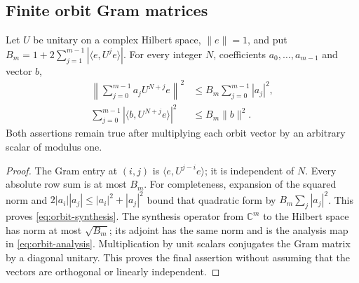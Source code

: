 \subsection{Finite orbit Gram matrices}
\begin{lemma}
\label{lem:finite-orbit-frame}
Let $U$ be unitary on a complex Hilbert space, $\|e\|=1$, and put
$B_m=1+2\sum_{j=1}^{m-1}|\langle e,U^je\rangle|$.
For every integer $N$, coefficients $a_0,\ldots,a_{m-1}$ and vector
$b$,
\begin{align}
 \left\|\sum_{j=0}^{m-1}a_jU^{N+j}e\right\|^2
                  &\le B_m\sum_{j=0}^{m-1}|a_j|^2,
                         \label{eq:orbit-synthesis}\\
 \sum_{j=0}^{m-1}|\langle b,U^{N+j}e\rangle|^2
                  &\le B_m\|b\|^2.
                         \label{eq:orbit-analysis}
\end{align}
Both assertions remain true after multiplying each orbit vector by an
arbitrary scalar of modulus one.
\end{lemma}
\begin{proof}
The Gram entry at $(i,j)$ is $\langle e,U^{j-i}e\rangle$; it is
independent of $N$. Every absolute row sum is at most $B_m$.
For completeness, expansion of the squared norm and
$2|a_i||a_j|\le|a_i|^2+|a_j|^2$ bound that quadratic form by
$B_m\sum_j|a_j|^2$. This proves \eqref{eq:orbit-synthesis}.
The synthesis operator from $\mathbb C^m$ to the Hilbert space has
norm at most $\sqrt{B_m}$; its adjoint has the same norm and is the
analysis map in \eqref{eq:orbit-analysis}. Multiplication by unit
scalars conjugates the Gram matrix by a diagonal unitary. This proves
the final assertion without assuming that the vectors are orthogonal
or linearly independent.
\end{proof}

